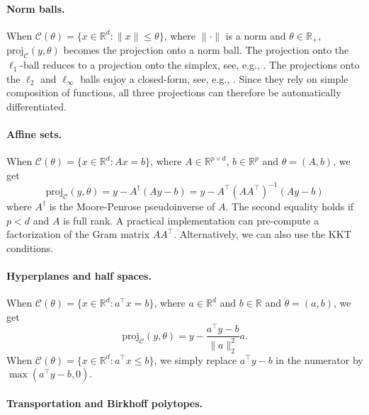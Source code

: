 \documentclass{article}
\def\cC{{\mathcal{C}}}
\def\RR{{\mathbb R}}
\def\proj{{\text{proj}}}
\begin{document}
\paragraph{Norm balls.}

When $\cC(\theta) = \{ x \in \RR^d \colon \|x\| \le \theta\}$, where $\|\cdot\|$
is a norm and $\theta \in \RR_+$, $\proj_\cC(y, \theta)$ becomes the projection
onto a norm ball.  The projection onto the $\ell_1$-ball reduces to a projection
onto the simplex, see, e.g., \cite{duchi}. The projections onto the $\ell_2$ and
$\ell_\infty$ balls enjoy a closed-form, see, e.g., \cite[\S 6.5]{parikh_2014}.
Since they rely on simple composition of functions, all three projections can
therefore be automatically differentiated.

\paragraph{Affine sets.}

When $\cC(\theta) = \{x \in \RR^d \colon A x = b\}$,
where $A \in \RR^{p \times d}$, $b \in \RR^p$ and $\theta = (A, b)$,
we get
\begin{equation}
\proj_{\cC}(y, \theta) = 
y - A^\dagger(Ay - b)
= y - A^\top (AA^\top)^{-1}(A y - b)
\end{equation}
where $A^\dagger$ is the Moore-Penrose pseudoinverse of $A$.
The second equality holds if $p < d$ and $A$ is full rank.
A practical implementation can pre-compute a factorization of the Gram matrix $A
A^\top$. Alternatively, we can also use the KKT conditions.

\paragraph{Hyperplanes and half spaces.}

When $\cC(\theta) = \{x \in \RR^d \colon a^\top x = b\}$, 
where $a \in \RR^d$ and $b \in \RR$ and $\theta = (a, b)$, 
we get
\begin{equation}
\proj_{\cC}(y, \theta) = 
y - \frac{a^\top y - b}{\|a\|_2^2} a.
\end{equation}
When $\cC(\theta) = \{x \in \RR^d \colon a^\top x \le b\}$, we simply replace
$a^\top y - b$ in the numerator by $\max(a^\top y - b, 0)$.

\paragraph{Transportation and Birkhoff polytopes.}
\end{document}

